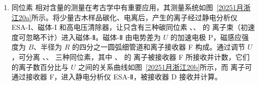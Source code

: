 \documentclass[\gkver]{gaokaozhenti}
\begin{document}
\begin{enumerate}
{$l = 2L$

所以线框受到的安培力大小为

$F_{\text{安}} = BIl = 2BIL$

②线框运动到 $x$ 时，安培力大小为

$F_{\text{安}} = 2BI(L - x)$

则初始时和线框中心运动至 $x = \frac{L}{2}$ 时的安培力分别为

$F_{\text{安}1} = 2BIL$，$F_{\text{安}2} = BIL$

则线框中心运动至 $x = \frac{L}{2}$ 过程中，安培力做功为

$W_{\text{安}} = \overline{F}_{\text{安}} \cdot \Delta x = \frac{F_{\text{安}1} + F_{\text{安}2}}{2} \cdot \frac{L}{2} = \frac{3}{4}BIL^{2}$

由动能定理 $W_{\text{安}} = \frac{1}{2}mv^{2}$

可得 $v = \sqrt{\frac{3IB}{2m}}L$

则安培力的冲量为

$I = mv = \sqrt{\frac{3IBm}{2}}L$

③由能量守恒定律

$UI = BILv + I^{2}R$

可得，恒流源提供的电压为

$U = BL^{2}\sqrt{\frac{3IB}{2m}} + IR$

（2）类比于简谐运动，则回复力为

$F_{\text{回}} = F_{\text{安}} = 2BI(L - x) = 2BIx' = kx'$

根据简谐运动周期公式 $T = 2\pi\sqrt{\frac{m}{k}} = 2\pi\sqrt{\frac{m}{2IB}}$。由题意可知，两次简谐运动周期相同，两次都从最大位移运动到平衡位置，时间均相同，即 $t_{1} - t_{2} = 0$。
}

\item
同位素  相对含量的测量在考古学中有重要应用，其测量系统如图~\ref{20251月浙江20a}所示。将少量古木样品碳化、电离后，产生的离子经过静电分析仪 ESA-I、磁体-I 和高电压清除器，让只含有三种碳同位素 、、 的  离子束（初速度可忽略不计）进入磁体-Ⅱ。磁体-Ⅱ 由电势差为 $U$ 的加速电极 P，磁感应强度为 $B$、半径为 $R$ 的四分之一圆弧细管道和离子接收器 F 构成。通过调节 $U$，可分离 、、 三种同位素，其中 、 的  离子被接收器 F 所接收并计数，它们的离子数百分比与 $U$ 之间的关系曲线如图~\ref{20251月浙江20b}所示，而  离子可通过接收器 F，进入静电分析仪 ESA-Ⅱ，被接收器 D 接收并计算。


\end{enumerate}
\end{document}
